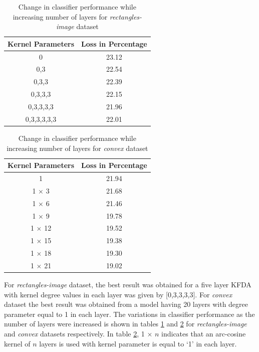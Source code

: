 \renewcommand{\arraystretch}{2}
\begin{table}
\centering
\begin{tabular}{|c|c|}
  \hline
  \textbf{Kernel Parameters} &  \textbf{Loss in Percentage}\\
  \hline
  0 & 23.12\\
  \hline
  0,3 & 22.54\\
  \hline
  0,3,3 & 22.39\\
  \hline
  0,3,3,3 & 22.15\\
  \hline
  0,3,3,3,3 & 21.96\\
  \hline
  0,3,3,3,3,3 & 22.01\\
  \hline  
\end{tabular}
\caption{Change in classifier performance while increasing number of layers for \textit{rectangles-image} dataset}
\label{chap4_tab1}
\end{table}
\renewcommand{\arraystretch}{1}

\renewcommand{\arraystretch}{2}
\begin{table}
\centering
\begin{tabular}{|c|c|}
  \hline
  \textbf{Kernel Parameters} &  \textbf{Loss in Percentage}\\
  \hline
  1 & 21.94\\
  \hline
  1 $\times$ 3 & 21.68\\
  \hline
  1 $\times$ 6 & 21.46\\
  \hline
  1 $\times$ 9 & 19.78\\
  \hline
  1 $\times$ 12 & 19.52\\
  \hline
  1 $\times$ 15 & 19.38\\
  \hline
  1 $\times$ 18 & 19.30\\
  \hline
  1 $\times$ 21 & 19.02\\
  \hline      
\end{tabular}
\caption{Change in classifier performance while increasing number of layers for \textit{convex} dataset}
\label{chap4_tab2}
\end{table}
\renewcommand{\arraystretch}{1}

For \textit{rectangles-image} dataset, the best result was obtained for a five layer KFDA with kernel degree values in each layer was given by [0,3,3,3,3]. For \textit{convex} dataset the best result was obtained from a model having 20 layers with degree parameter equal to 1 in each layer. The variations in classifier performance as the number of layers were increased is shown in tables \ref{chap4_tab1} and \ref{chap4_tab2} for \textit{rectangles-image} and \textit{convex} datasets respectively. In table \ref{chap4_tab2}, 1 $\times$ $n$ indicates that an arc-cosine kernel of $n$ layers is used with kernel parameter is equal to `1' in each layer.


